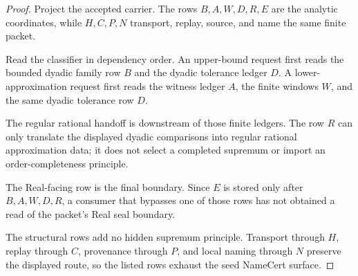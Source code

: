 \begin{proof}
Project the accepted carrier. The rows $B,A,W,D,R,E$ are the analytic coordinates, while $H,C,P,N$ transport, replay, source, and name the same finite packet.

Read the classifier in dependency order. An upper-bound request first reads the bounded dyadic family row $B$ and the dyadic tolerance ledger $D$. A lower-approximation request first reads the witness ledger $A$, the finite windows $W$, and the same dyadic tolerance row $D$.

The regular rational handoff is downstream of those finite ledgers. The row $R$ can only translate the displayed dyadic comparisons into regular rational approximation data; it does not select a completed supremum or import an order-completeness principle.

The Real-facing row is the final boundary. Since $E$ is stored only after $B,A,W,D,R$, a consumer that bypasses one of those rows has not obtained a read of the packet's Real seal boundary.

The structural rows add no hidden supremum principle. Transport through $H$, replay through $C$, provenance through $P$, and local naming through $N$ preserve the displayed route, so the listed rows exhaust the seed NameCert surface.
\end{proof}

